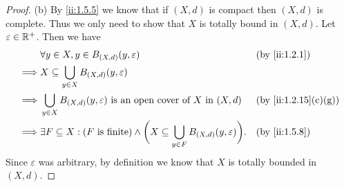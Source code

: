 \begin{proof}{(b)}
  By \cref{ii:1.5.5} we know that if \((X, d)\) is compact then \((X, d)\) is complete.
  Thus we only need to show that \(X\) is totally bound in \((X, d)\).
  Let \(\varepsilon \in \mathbb{R}^+\).
  Then we have
  \begin{align*}
             & \forall y \in X, y \in B_{(X, d)}(y, \varepsilon)                                                                         &  & \by{ii:1.2.1}       \\
    \implies & X \subseteq \bigcup_{y \in X} B_{(X, d)}(y, \varepsilon)                                                                                           \\
    \implies & \bigcup_{y \in X} B_{(X, d)}(y, \varepsilon) \text{ is an open cover of } X \text{ in } (X, d)                            &  & \by{ii:1.2.15}[c,g] \\
    \implies & \exists F \subseteq X : (F \text{ is finite}) \land \bigg(X \subseteq \bigcup_{y \in F} B_{(X, d)}(y, \varepsilon)\bigg). &  & \by{ii:1.5.8}
  \end{align*}
  Since \(\varepsilon\) was arbitrary, by definition we know that \(X\) is totally bounded in \((X, d)\).
\end{proof}


